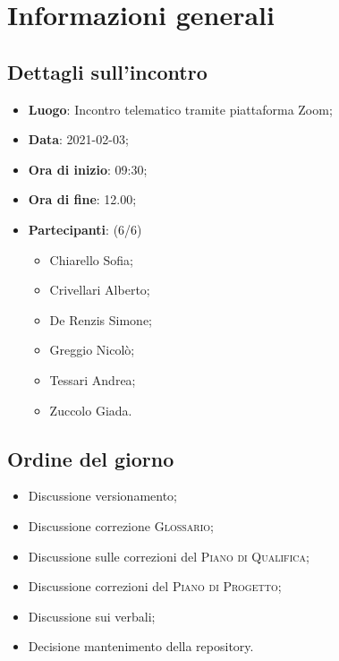 \section{Informazioni generali}

\subsection{Dettagli sull'incontro}
\begin{itemize}
\item \textbf{Luogo}: Incontro telematico tramite piattaforma Zoom;
\item \textbf{Data}: 2021-02-03;
\item \textbf{Ora di inizio}: 09:30;
\item \textbf{Ora di fine}: 12.00;
\item \textbf{Partecipanti}: (6/6)
\begin{itemize}
	\item Chiarello Sofia;
    \item Crivellari Alberto;
    \item De Renzis Simone;
    \item Greggio Nicolò;
    \item Tessari Andrea;
    \item Zuccolo Giada.
\end{itemize}
\end{itemize}

\subsection{Ordine del giorno}
\begin{itemize}
	\item Discussione versionamento;
	\item Discussione correzione \textsc{Glossario};
	\item Discussione sulle correzioni del \textsc{Piano di Qualifica};
	\item Discussione correzioni del \textsc{Piano di Progetto};
	\item Discussione sui verbali;
	\item Decisione mantenimento della repository.
\end{itemize}


